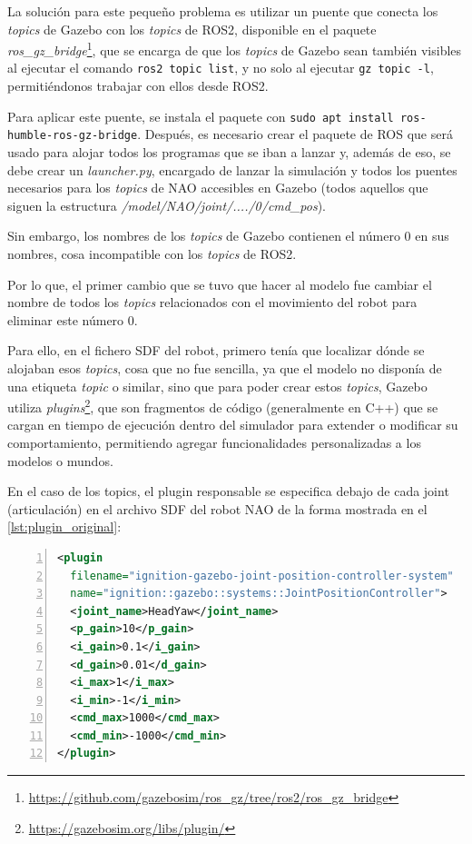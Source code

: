 La solución para este pequeño problema es utilizar un puente que conecta los \textit{topics} de Gazebo con los \textit{topics} de ROS2, disponible en el paquete \textit{ros\_gz\_bridge}\footnote{\url{https://github.com/gazebosim/ros_gz/tree/ros2/ros_gz_bridge}}, que se encarga de que los \textit{topics} de Gazebo sean también visibles al ejecutar el comando \texttt{ros2 topic list}, y no solo al ejecutar \texttt{gz topic -l}, permitiéndonos trabajar con ellos desde ROS2.

Para aplicar este puente, se instala el paquete con \texttt{sudo apt install ros-humble-ros-gz-bridge}. Después, es necesario crear el paquete de ROS que será usado para alojar todos los programas que se iban a lanzar y, además de eso, se debe crear un \textit{launcher.py}, encargado de lanzar la simulación y todos los puentes necesarios para los \textit{topics} de NAO accesibles en Gazebo (todos aquellos que siguen la estructura \textit{/model/NAO/joint/..../0/cmd\_pos}).

Sin embargo, los nombres de los \textit{topics} de Gazebo contienen el número 0 en sus nombres, cosa incompatible con los \textit{topics} de ROS2.

Por lo que, el primer cambio que se tuvo que hacer al modelo fue cambiar el nombre de todos los \textit{topics} relacionados con el movimiento del robot para eliminar este número 0. 

Para ello, en el fichero SDF del robot, primero tenía que localizar dónde se alojaban esos \textit{topics}, cosa que no fue sencilla, ya que el modelo no disponía de una etiqueta \textit{topic} o similar, sino que para poder crear estos \textit{topics}, Gazebo utiliza \textit{plugins}\footnote{\url{https://gazebosim.org/libs/plugin/}}, que son fragmentos de código (generalmente en C++) que se cargan en tiempo de ejecución dentro del simulador para extender o modificar su comportamiento, permitiendo agregar funcionalidades personalizadas a los modelos o mundos.

En el caso de los topics, el plugin responsable se especifica debajo de cada joint (articulación) en el archivo SDF del robot NAO de la forma mostrada en el \autoref{lst:plugin_original}:

\begin{lstlisting}[language=XML, caption={Inclusión del plugin en el modelo}, label={lst:plugin_original}, numbers=left, backgroundcolor=\color{gray!10}]    
<plugin
  filename="ignition-gazebo-joint-position-controller-system"
  name="ignition::gazebo::systems::JointPositionController">
  <joint_name>HeadYaw</joint_name>
  <p_gain>10</p_gain>
  <i_gain>0.1</i_gain>
  <d_gain>0.01</d_gain>
  <i_max>1</i_max>
  <i_min>-1</i_min>
  <cmd_max>1000</cmd_max>
  <cmd_min>-1000</cmd_min>
</plugin>
\end{lstlisting}

